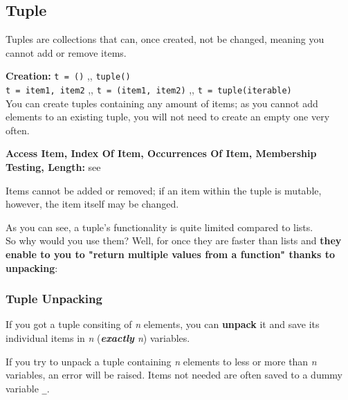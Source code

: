 \subsection{Tuple}

    Tuples are collections that can, once created, not be changed, meaning you
    cannot add or remove items.

    \begin{indentblock}

        \textbf{Creation:} \texttt{t = ()} \sep{,} \texttt{tuple()} \\
        \texttt{t = item1, item2} \sep{,}
        \texttt{t = (item1, item2)} \sep{,}
        \texttt{t = tuple(iterable)} \\
        You can create tuples containing any amount of items; as you cannot add elements to an
        existing tuple, you will not need to create an empty one very often.

        \textbf{Access Item, Index Of Item, Occurrences Of Item, Membership Testing, Length:}
        see 

        Items cannot be added or removed; if an item within the tuple is mutable, however,
        the item itself may be changed.

    \end{indentblock}

    As you can see, a tuple's functionality is quite limited compared to lists. \\
    So why would you use them? Well, for once they are faster than lists and
    \textbf{they enable to you to "return multiple values from a function" thanks to unpacking}:

    \subsubsection{Tuple Unpacking}

        If you got a tuple consiting of \textit{n} elements, you can \textbf{unpack} it and save
        its individual items in \textit{n} (\textit{\textbf{exactly} n}) variables.


        If you try to unpack a tuple containing \textit{n} elements to less or more than \textit{n} variables,
        an error will be raised. Items not needed are often saved to a dummy variable \texttt{\_}.

